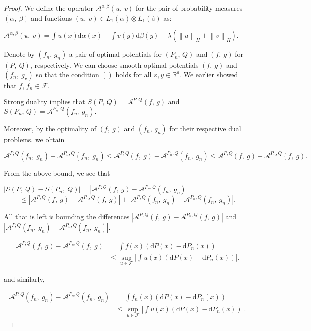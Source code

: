 	\begin{proof}
		
		We define the operator $\mathcal{A}^{\alpha,\beta}(u,\ v)$ for the pair of probability measures $(\alpha,\ \beta)$ and functions $(u,\ v)\in L_{1}(\alpha)\otimes L_{1}(\beta)$ as:
		
		$\displaystyle \mathcal{A}^{\alpha,\beta}(u,\ v)=\int u(x)\mathrm{d}\alpha(x)+\int v(y)\mathrm{d}\beta(y)-\lambda(\left\|u\right\|_H+\left\|v\right\|_H).$
		
		Denote by $(f_{n},\ g_{n})$ a pair of optimal potentials for $(P_{n},\ Q)$ and $(f,\ g)$ for $(P,\ Q)$, respectively. We can choose smooth optimal potentials $(f,\ g)$ and $(f_{n},\ g_{n})$ so that the condition $()$ holds for all $x, y\in \mathbb{R}^{d}.$ We earlier showed that $f$, $f_n\in \mathcal{F}$.
		
		Strong duality implies that $S(P,\ Q)=\mathcal{A}^{P,Q}(f,\ g)$ and $S(P_{n},\ Q)=\mathcal{A}^{P_{n},Q}(f_{n},\ g_{n}).$
		
		Moreover, by the optimality of $(f,\ g)$ and $(f_{n},\ g_{n})$ for their respective dual problems, we obtain
		
		$$\mathcal{A}^{P,Q}(f_{n},\ g_{n})-\mathcal{A}^{P_{n},Q}(f_{n},\ g_{n})\leq \mathcal{A}^{P,Q}(f,\ g)-\mathcal{A}^{P_{n},Q}(f_{n},\ g_{n})\leq \mathcal{A}^{P,Q}(f,\ g)-\mathcal{A}^{P_{n},Q}(f,\ g).$$
		
		From the above bound, we see that
		
		$|S(P,\ Q)-S(P_{n},\ Q)|=|\mathcal{A}^{P,Q}(f,\ g)-\mathcal{A}^{P_{n},Q}(f_{n},\ g_{n})|$
		$$
		\leq|\mathcal{A}^{P,Q}(f,\ g)-\mathcal{A}^{P_{n},Q}(f,\ g)|+|\mathcal{A}^{P,Q}(f_{n},\ g_{n})-\mathcal{A}^{P_{n},Q}(f_{n},\ g_{n})|.
		$$
		
		All that is left is bounding the differences $|\mathcal{A}^{P,Q}(f,\ g)-\mathcal{A}^{P_{n},Q}(f,\ g)|$ and $|\mathcal{A}^{P,Q}(f_{n},\ g_{n})- \mathcal{A}^{P_{n},Q}(f_{n},\ g_{n})|.$
		
		\begin{align*}
			\mathcal{A}^{P,Q}(f,\ g)-\mathcal{A}^{P_{n},Q}(f,\ g) &=\int f(x)(\mathrm{d}P(x)-\mathrm{d}P_{n}(x)) \\
			&\leq\sup_{u\in \mathcal{F}}|\int u(x)(\mathrm{d}P(x)-\mathrm{d}P_{n}(x))|.
		\end{align*}
		
		and similarly,
		
		\begin{align*}
			\mathcal{A}^{P,Q}(f_n,\ g_n)-\mathcal{A}^{P_{n},Q}(f_n,\ g_n) &=\int f_n(x)(\mathrm{d}P(x)-\mathrm{d}P_{n}(x)) \\
			&\leq\sup_{u\in \mathcal{F}}|\int u(x)(\mathrm{d}P(x)-\mathrm{d}P_{n}(x))|.
		\end{align*}
		
	\end{proof}
	
